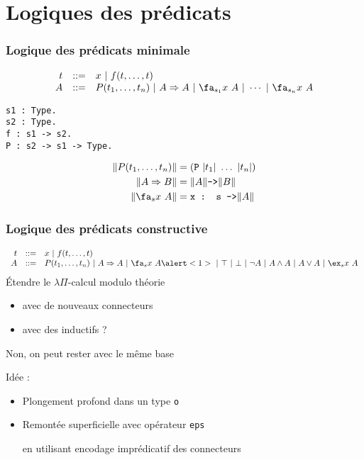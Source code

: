 \documentclass[12pt,aspectratio=169]{beamer}
\newcommand\lst[1]{{\lstinline{#1}}}
\begin{document}
\section{Logiques des prédicats}

\begin{frame}[fragile]
  \frametitle{Logique des prédicats minimale}

 $$
  \begin{array}{r@{~~~::=~~~}l}
    t & x~|~f(t,\ldots,t)\\
  A&P(t_1, \ldots, t_n)~|~A \Rightarrow
  A~|~\fa_{s_1} x~A~|~\cdots~|~\fa_{s_n} x~A
  \end{array}
  $$
  \pause

\begin{lstlisting}
s1 : Type.
s2 : Type.
f : s1 -> s2.
P : s2 -> s1 -> Type.
\end{lstlisting}
  
\begin{align*}
\|P(t_1,\ldots,t_n)\| &= (\texttt{P}~|t_1|~\ldots~|t_n|)\\
\|A \Rightarrow B\| &= \|A\| \texttt{->} \|B\|\\
\|\fa_s x~A\| &= \texttt{x : s ->} \|A\|
\end{align*}

\end{frame}

\begin{frame}[fragile]
  \frametitle{Logique des prédicats constructive}
 $$
  \begin{array}{r@{~~~::=~~~}l}
    t & x~|~f(t,\ldots,t)\\
  A&P(t_1, \ldots, t_n)~|~A \Rightarrow
  A~|~\fa_s x~A\alert<1>{~|~\top~|~\bot~|~\neg A~|~A \wedge A~|~A \vee A~|~\ex_s x~A}
  \end{array}
  $$
  \pause
  Étendre le $\lambda\Pi$-calcul modulo théorie
  \begin{itemize}
  \item avec de nouveaux connecteurs
    \item avec des inductifs ?\pause
  \end{itemize}
  Non, on peut rester avec le même base
  \bigskip
  
  Idée :
  \begin{itemize}
  \item Plongement profond dans un type \lst{o}
  \item Remontée superficielle avec opérateur \lst{eps}

    en utilisant encodage imprédicatif des connecteurs
  \end{itemize}
\end{frame}
\end{document}
